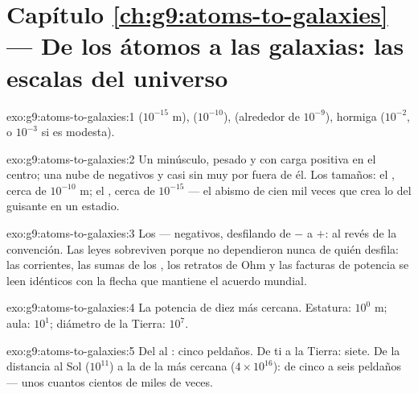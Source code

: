 \section*{Capítulo \ref{ch:g9:atoms-to-galaxies} --- De los átomos a las galaxias: las escalas del universo}

\begin{solution}{exo:g9:atoms-to-galaxies:1}
 ($10^{-15}$ \unit{m}),  ($10^{-10}$),
 (alrededor de $10^{-9}$), hormiga ($10^{-2}$, o
$10^{-3}$ si es modesta).
\end{solution}

\begin{solution}{exo:g9:atoms-to-galaxies:2}
Un  minúsculo, pesado y con carga positiva en el centro; una
nube de  negativos y casi sin  muy por fuera de él.
Los tamaños: el , cerca de $10^{-10}$ \unit{m}; el
, cerca de $10^{-15}$ --- el abismo de cien mil veces que
crea lo del guisante en un estadio.
\end{solution}

\begin{solution}{exo:g9:atoms-to-galaxies:3}
Los  --- negativos, desfilando de $-$ a $+$: al revés de
la convención. Las leyes sobreviven porque no dependieron nunca de
quién desfila: las corrientes, las sumas de los , los
retratos de Ohm y las facturas de potencia se leen idénticos con la
flecha que mantiene el acuerdo mundial.
\end{solution}

\begin{solution}{exo:g9:atoms-to-galaxies:4}
La potencia de diez más cercana. Estatura: $10^{0}$ \unit{m}; aula:
$10^{1}$; diámetro de la Tierra: $10^{7}$.
\end{solution}

\begin{solution}{exo:g9:atoms-to-galaxies:5}
Del  al : cinco peldaños. De ti a la
Tierra: siete. De la distancia al Sol ($10^{11}$) a la de la
 más cercana ($4 \times 10^{16}$): de cinco a seis peldaños
--- unos cuantos cientos de miles de veces.
\end{solution}

